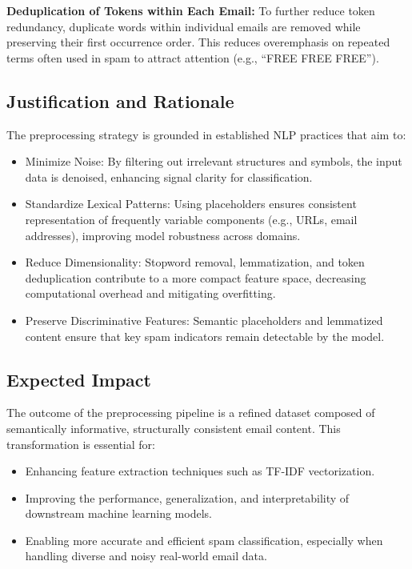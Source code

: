 \textbf{Deduplication of Tokens within Each Email:} To further reduce token redundancy, duplicate words within individual emails are removed while preserving their first occurrence order.
This reduces overemphasis on repeated terms often used in spam to attract attention (e.g., “FREE FREE FREE”).

\subsection{Justification and Rationale}
\label{subsec:justification-and-rationale}
The preprocessing strategy is grounded in established NLP practices that aim to:
\begin{itemize}
    \item Minimize Noise: By filtering out irrelevant structures and symbols, the input data is denoised, enhancing signal clarity for classification.
    \item Standardize Lexical Patterns: Using placeholders ensures consistent representation of frequently variable components (e.g., URLs, email addresses), improving model robustness across domains.
    \item Reduce Dimensionality: Stopword removal, lemmatization, and token deduplication contribute to a more compact feature space, decreasing computational overhead and mitigating overfitting.
    \item Preserve Discriminative Features: Semantic placeholders and lemmatized content ensure that key spam indicators remain detectable by the model.
\end{itemize}

\subsection{Expected Impact}
\label{subsec:expected-impact}
The outcome of the preprocessing pipeline is a refined dataset composed of semantically informative, structurally consistent email content.
This transformation is essential for:
\begin{itemize}
    \item Enhancing feature extraction techniques such as TF-IDF vectorization.
    \item Improving the performance, generalization, and interpretability of downstream machine learning models.
    \item Enabling more accurate and efficient spam classification, especially when handling diverse and noisy real-world email data.
\end{itemize}

